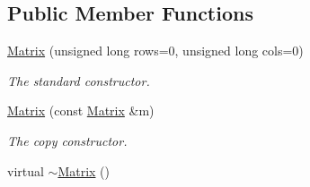 \subsection*{Public Member Functions}
\begin{DoxyCompactItemize}
\item 
\hyperlink{class_matrix_a53f60218c002f2bb454695a1fc35c5d3}{Matrix} (unsigned long rows=0, unsigned long cols=0)
\begin{DoxyCompactList}\small\item\em The standard constructor. \end{DoxyCompactList}\item 
\hyperlink{class_matrix_a3796b4f32dc8e11f908a90fd3dd39c45}{Matrix} (const \hyperlink{class_matrix}{Matrix} \&m)
\begin{DoxyCompactList}\small\item\em The copy constructor. \end{DoxyCompactList}\item 
virtual \hyperlink{class_matrix_ab8cec5fdc5a9d228e19d1d1e5ccac8cf}{$\sim$\+Matrix} ()\hypertarget{class_matrix_ab8cec5fdc5a9d228e19d1d1e5ccac8cf}{}\label{class_matrix_ab8cec5fdc5a9d228e19d1d1e5ccac8cf}


\end{DoxyCompactItemize}
